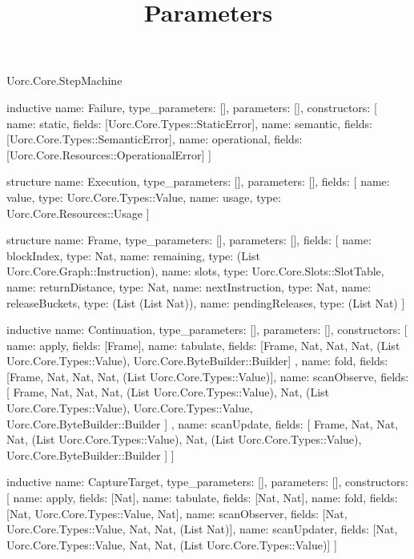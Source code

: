 \begin{lexlean}{Uorc.Core.StepMachine}
\title{Parameters}
\begin{semanticmodule}
inductive{
  name: Failure,
  type_parameters: [],
  parameters: [],
  constructors: [
    {name: static, fields: [Uorc.Core.Types::StaticError]},
    {name: semantic, fields: [Uorc.Core.Types::SemanticError]},
    {name: operational, fields: [Uorc.Core.Resources::OperationalError]}
  ]
}

structure{
  name: Execution,
  type_parameters: [],
  parameters: [],
  fields: [
    {name: value, type: Uorc.Core.Types::Value},
    {name: usage, type: Uorc.Core.Resources::Usage}
  ]
}

structure{
  name: Frame,
  type_parameters: [],
  parameters: [],
  fields: [
    {name: blockIndex, type: Nat},
    {name: remaining, type: (List Uorc.Core.Graph::Instruction)},
    {name: slots, type: Uorc.Core.Slots::SlotTable},
    {name: returnDistance, type: Nat},
    {name: nextInstruction, type: Nat},
    {name: releaseBuckets, type: (List (List Nat))},
    {name: pendingReleases, type: (List Nat)}
  ]
}

inductive{
  name: Continuation,
  type_parameters: [],
  parameters: [],
  constructors: [
    {name: apply, fields: [Frame]},
    {
      name: tabulate,
      fields: [Frame, Nat, Nat, Nat, (List Uorc.Core.Types::Value), Uorc.Core.ByteBuilder::Builder]
    },
    {name: fold, fields: [Frame, Nat, Nat, Nat, (List Uorc.Core.Types::Value)]},
    {
      name: scanObserve,
      fields: [
        Frame,
        Nat,
        Nat,
        Nat,
        (List Uorc.Core.Types::Value),
        Nat,
        (List Uorc.Core.Types::Value),
        Uorc.Core.Types::Value,
        Uorc.Core.ByteBuilder::Builder
      ]
    },
    {
      name: scanUpdate,
      fields: [
        Frame,
        Nat,
        Nat,
        Nat,
        (List Uorc.Core.Types::Value),
        Nat,
        (List Uorc.Core.Types::Value),
        Uorc.Core.ByteBuilder::Builder
      ]
    }
  ]
}

inductive{
  name: CaptureTarget,
  type_parameters: [],
  parameters: [],
  constructors: [
    {name: apply, fields: [Nat]},
    {name: tabulate, fields: [Nat, Nat]},
    {name: fold, fields: [Nat, Uorc.Core.Types::Value, Nat]},
    {name: scanObserver, fields: [Nat, Uorc.Core.Types::Value, Nat, Nat, (List Nat)]},
    {
      name: scanUpdater,
      fields: [Nat, Uorc.Core.Types::Value, Nat, Nat, (List Uorc.Core.Types::Value)]
    }
  ]
}


\end{semanticmodule}
\end{lexlean}
